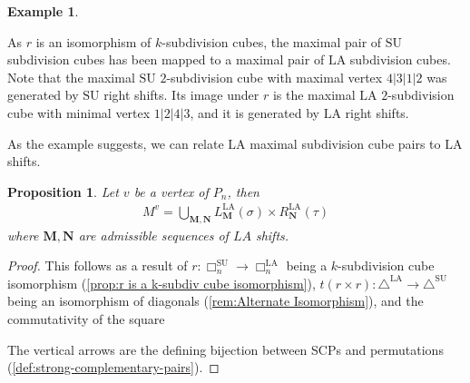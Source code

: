 \documentclass{amsart}
\newcommand{\red}{\color{red}} %
\newtheorem{proposition}[theorem]{Proposition}
\theoremstyle{definition}
\newtheorem{example}[theorem]{Example}
\newcommand{\SU}{\mathrm{SU}}
\newcommand{\LA}{\mathrm{LA}}
\newcommand{\SUD}{\triangle^{\mathrm{SU}}}
\newcommand{\LAD}{\triangle^{\mathrm{LA}}}
\newcommand{\divcube}[1]{\Box_{#1}}
\newcommand{\maxsubdivpairsv}{M^v}
\begin{document}
\begin{example}
\begin{center}
{
}
\end{center}
As $r$ is an isomorphism of $k$-subdivision cubes, the maximal pair of $\SU$ subdivision cubes has been mapped to a maximal pair of $\LA$ subdivision cubes.
Note that the maximal $\SU$ $2$-subdivision cube with maximal vertex $4|3|1|2$ was generated by $\SU$ right shifts.
Its image under $r$ is the maximal $\LA$ $2$-subdivision cube with minimal vertex $1|2|4|3$, and it is generated by $\LA$ right shifts.
\end{example}

As the example suggests, we can relate $\LA$ maximal subdivision cube pairs to $\LA$ shifts.
\begin{proposition}
Let $v$ be a vertex of $P_n$, then
\begin{align*}
	\maxsubdivpairsv = \bigcup_{\mathbf{M},\mathbf{N}} L_\mathbf{M}^{\LA}(\sigma) \times R_{\mathbf{N}}^{\LA}(\tau)
\end{align*}
where $\mathbf{M},\mathbf{N}$ are admissible sequences of $LA$ shifts.
\end{proposition}
\begin{proof}
This follows as a result of $r:\divcube{n}^{\SU}\to \divcube{n}^{\LA}$ being a $k$-subdivision cube isomorphism (\cref{prop:r is a k-subdiv cube isomorphism}), $t(r\times r):\LAD\to \SUD$ being an isomorphism of diagonals (\cref{rem:Alternate Isomorphism}), and the commutativity of the square 
\begin{center}
\end{center}
The vertical arrows are the defining bijection between SCPs and permutations (\cref{def:strong-complementary-pairs}).
\end{proof}
\end{document}
